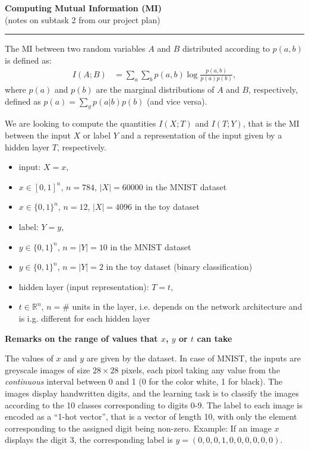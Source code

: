 \documentclass[12pt]{report}
\author{Anna Golubeva}
\begin{document}
\begin{center}
{\bf\Large{Computing Mutual Information (MI)}}\\
\vspace{5mm}
(notes on subtask 2 from our project plan)
\end{center}
\noindent\rule{\textwidth}{0.4pt}

The MI between two random variables $A$ and $B$ distributed according to $p(a,b)$ is defined as:
\begin{align}
I(A;B) &= \sum \limits_{a} \sum \limits_{b} p(a,b) \log\frac{p(a,b)}{p(a)p(b)},
\end{align}
where $p(a)$ and $p(b)$ are the marginal distributions of $A$ and $B$, respectively, defined as $p(a) = \sum_y p(a|b)p(b)$ (and vice versa).

We are looking to compute the quantities $I(X;T)$ and $I(T;Y)$, that is the MI between the input $X$ or label $Y$ and a representation of the input given by a hidden layer $T$, respectively.
\begin{itemize}
\item input: $X=x$,
\item[] $x\in [0,1]^n$, $n=784$, $|X| = 60000$ in the MNIST dataset
\item[] $x\in \{0,1\}^n$, $n=12$, $|X| = 4096$ in the toy dataset
\item label: $Y=y$,
\item[] $y\in \{0,1\}^n$, $n = |Y| = 10$ in the MNIST dataset
\item[] $y\in \{0,1\}^n$, $n= |Y| = 2$ in the toy dataset (binary classification)
\item hidden layer (input representation): $T=t$,
\item[] $t\in\mathbb{R}^n$, $n=\#$ units in the layer, i.e. depends on the network architecture and is i.g. different for each hidden layer
\end{itemize}

\vspace{1cm}
{\bf Remarks on the range of values that $x$, $y$ or $t$ can take}

The values of $x$ and $y$ are given by the dataset. In case of MNIST, the inputs are greyscale images of size $28\times 28$ pixels, each pixel taking any value from the {\it continuous} interval between 0 and 1 (0 for the color white, 1 for black). The images display handwritten digits, and the learning task is to classify the images according to the 10 classes corresponding to digits 0-9. The label to each image is encoded as a ``1-hot vector'', that is a vector of length 10, with only the element corresponding to the assigned digit being non-zero. Example: If an image $x$ displays the digit 3, the corresponding label is $y = (0,0,0,1,0,0,0,0,0,0)$.
\end{document}
